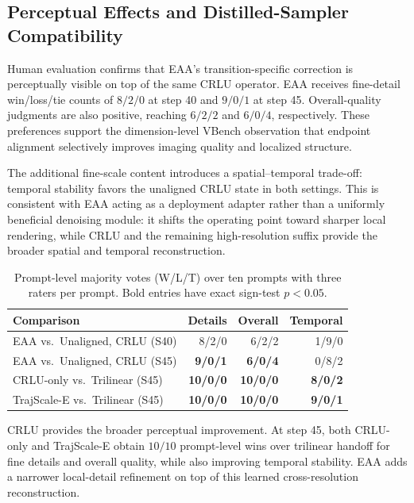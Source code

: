 \subsection{Perceptual Effects and Distilled-Sampler Compatibility}

Human evaluation confirms that EAA's transition-specific correction is
perceptually visible on top of the same CRLU operator. EAA receives fine-detail
win/loss/tie counts of \(8/2/0\) at step 40 and \(9/0/1\) at step 45.
Overall-quality judgments are also positive, reaching \(6/2/2\) and
\(6/0/4\), respectively. These preferences support the dimension-level VBench
observation that endpoint alignment selectively improves imaging quality and
localized structure.

The additional fine-scale content introduces a spatial--temporal trade-off:
temporal stability favors the unaligned CRLU state in both settings. This is
consistent with EAA acting as a deployment adapter rather than a uniformly
beneficial denoising module: it shifts the operating point toward sharper local
rendering, while CRLU and the remaining high-resolution suffix provide the
broader spatial and temporal reconstruction.

\begin{table}[!t]
\centering
\footnotesize
\setlength{\tabcolsep}{2pt}
\begin{tabular}{lrrr}
\toprule
Comparison & Details & Overall & Temporal \\
\midrule
EAA vs.\ Unaligned, CRLU (S40) & 8/2/0 & 6/2/2 & 1/9/0 \\
EAA vs.\ Unaligned, CRLU (S45) &
\textbf{9/0/1} & \textbf{6/0/4} & 0/8/2 \\
CRLU-only vs.\ Trilinear (S45) &
\textbf{10/0/0} & \textbf{10/0/0} & \textbf{8/0/2} \\
TrajScale-E vs.\ Trilinear (S45) &
\textbf{10/0/0} & \textbf{10/0/0} & \textbf{9/0/1} \\
\bottomrule
\end{tabular}
\caption{Prompt-level majority votes (W/L/T) over ten prompts with three
raters per prompt. Bold entries have exact sign-test \(p<0.05\).}
\label{tab:human}
\end{table}

CRLU provides the broader perceptual improvement. At step 45, both CRLU-only
and TrajScale-E obtain \(10/10\) prompt-level wins over trilinear handoff for
fine details and overall quality, while also improving temporal stability. EAA
adds a narrower local-detail refinement on top of this learned
cross-resolution reconstruction.

